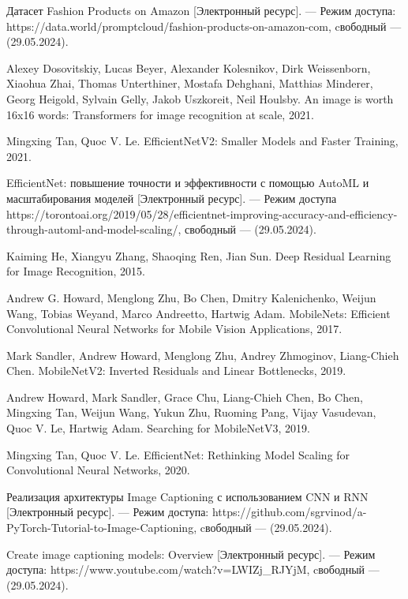 \begin{thebibliography}{0}
	Датасет Fashion Products on Amazon [Электронный ресурс]. — Режим доступа: https://data.world/promptcloud/fashion-products-on-amazon-com, cвободный — (29.05.2024).
	
	Alexey Dosovitskiy, Lucas Beyer, Alexander Kolesnikov, Dirk Weissenborn, Xiaohua Zhai, Thomas Unterthiner, Mostafa Dehghani, Matthias Minderer,
	Georg Heigold, Sylvain Gelly, Jakob Uszkoreit, Neil Houlsby. An image is worth 16x16 words: Transformers for image recognition at scale, 2021.
	
	Mingxing Tan, Quoc V. Le. EfficientNetV2: Smaller Models and Faster Training, 2021.
	
	EfficientNet: повышение точности и эффективности с помощью AutoML и масштабирования моделей [Электронный ресурс]. — Режим доступа https://torontoai.org/2019/05/28/efficientnet-improving-accuracy-and-efficiency-through-automl-and-model-scaling/, свободный — (29.05.2024).
	
	Kaiming He, Xiangyu Zhang, Shaoqing Ren, Jian Sun. Deep Residual Learning for Image Recognition, 2015.
	
	Andrew G. Howard, Menglong Zhu, Bo Chen, Dmitry Kalenichenko, Weijun Wang, Tobias Weyand, Marco Andreetto, Hartwig Adam. MobileNets: Efficient Convolutional Neural Networks for Mobile Vision Applications, 2017.
	
	Mark Sandler, Andrew Howard, Menglong Zhu, Andrey Zhmoginov, Liang-Chieh Chen. MobileNetV2: Inverted Residuals and Linear Bottlenecks, 2019.
	
	Andrew Howard, Mark Sandler, Grace Chu, Liang-Chieh Chen, Bo Chen, Mingxing Tan,
	Weijun Wang, Yukun Zhu, Ruoming Pang, Vijay Vasudevan, Quoc V. Le, Hartwig Adam. Searching for MobileNetV3, 2019.
	
	Mingxing Tan, Quoc V. Le. EfficientNet: Rethinking Model Scaling for Convolutional Neural Networks, 2020.
	
	Реализация архитектуры Image Captioning с использованием CNN и RNN [Электронный ресурс]. — Режим доступа: https://github.com/sgrvinod/a-PyTorch-Tutorial-to-Image-Captioning, cвободный — (29.05.2024).
	
	Create image captioning models: Overview [Электронный ресурс]. — Режим доступа: https://www.youtube.com/watch?v=LWIZj\_RJYjM, cвободный — (29.05.2024).
	

\end{thebibliography}
